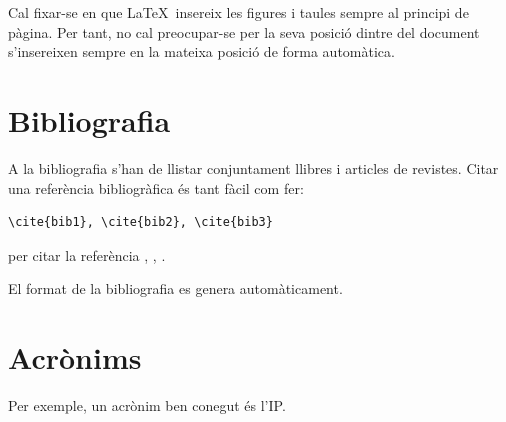 Cal fixar-se en que \LaTeX\ insereix les figures i taules sempre al principi de pàgina. Per tant, no cal preocupar-se per la seva posició
dintre del document s'insereixen sempre en la mateixa posició de forma automàtica.

\section{Bibliografia}

A la bibliografia s'han de llistar conjuntament llibres i articles de revistes.
Citar una referència bibliogràfica és tant fàcil com fer:
\begin{verbatim}
\cite{bib1}, \cite{bib2}, \cite{bib3}
\end{verbatim}
per citar la referència \cite{bib1}, \cite{bib2}, \cite{bib3}. 

El format de la bibliografia es genera automàticament.

\section{Acrònims}

Per exemple, un acrònim ben conegut és l'\ac{IP}.
